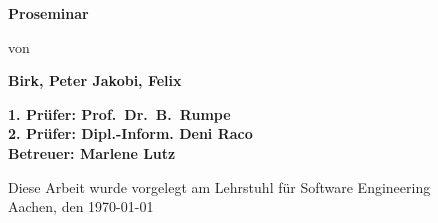 \begin{titlepage}
\begin{flushleft}
{    {\Large \textbf{Proseminar}\\}
		\vspace{3em} 
		
		{\large von\\} %
    
    {\LARGE \textbf{Birk, Peter 	Jakobi, Felix}\\}
    \vspace{3em} 
		    
    {\Large \textbf{1. Prüfer: Prof.\ Dr.\ B.\ Rumpe}\\}
    \vspace{1em} 
    {\Large \textbf{2. Prüfer: Dipl.-Inform. Deni Raco}\\}
    \vspace{1em} 
    {\Large \textbf{Betreuer: Marlene Lutz}\\}
    \vspace{7em} 

    {\large Diese Arbeit wurde vorgelegt am Lehrstuhl für Software Engineering \\}
    \vspace{1em}
		{\large	Aachen, den \today\\}
  }
\end{flushleft}

\end{titlepage}





